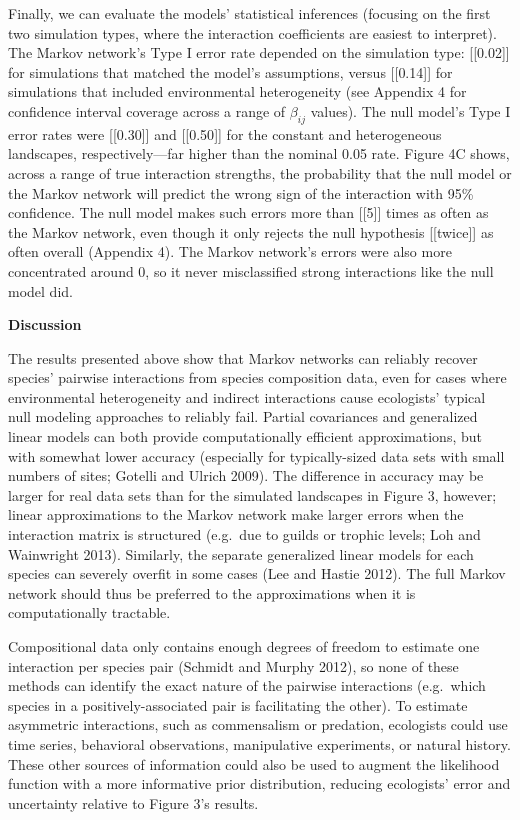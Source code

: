 \documentclass[12pt,]{article}
\begin{document}
\begin{spacing}{1.9}
\begin{flushleft}
Finally, we can evaluate the models' statistical inferences (focusing on
the first two simulation types, where the interaction coefficients are
easiest to interpret). The Markov network's Type I error rate depended
on the simulation type: {[}{[}0.02{]}{]} for simulations that matched
the model's assumptions, versus {[}{[}0.14{]}{]} for simulations that
included environmental heterogeneity (see Appendix 4 for confidence
interval coverage across a range of \(\beta_{ij}\) values). The null
model's Type I error rates were {[}{[}0.30{]}{]} and {[}{[}0.50{]}{]}
for the constant and heterogeneous landscapes, respectively---far higher
than the nominal 0.05 rate. Figure 4C shows, across a range of true
interaction strengths, the probability that the null model or the Markov
network will predict the wrong sign of the interaction with 95\%
confidence. The null model makes such errors more than {[}{[}5{]}{]}
times as often as the Markov network, even though it only rejects the
null hypothesis {[}{[}twice{]}{]} as often overall (Appendix 4). The
Markov network's errors were also more concentrated around 0, so it
never misclassified strong interactions like the null model did.

\noindent
\textbf{Discussion}

\noindent
The results presented above show that Markov networks can reliably
recover species' pairwise interactions from species composition data,
even for cases where environmental heterogeneity and indirect
interactions cause ecologists' typical null modeling approaches to
reliably fail. Partial covariances and generalized linear models can
both provide computationally efficient approximations, but with somewhat
lower accuracy (especially for typically-sized data sets with small
numbers of sites; Gotelli and Ulrich 2009). The difference in accuracy
may be larger for real data sets than for the simulated landscapes in
Figure 3, however; linear approximations to the Markov network make
larger errors when the interaction matrix is structured (e.g.~due to
guilds or trophic levels; Loh and Wainwright 2013). Similarly, the
separate generalized linear models for each species can severely overfit
in some cases (Lee and Hastie 2012). The full Markov network should thus
be preferred to the approximations when it is computationally tractable.

Compositional data only contains enough degrees of freedom to estimate
one interaction per species pair (Schmidt and Murphy 2012), so none of
these methods can identify the exact nature of the pairwise interactions
(e.g.~which species in a positively-associated pair is facilitating the
other). To estimate asymmetric interactions, such as commensalism or
predation, ecologists could use time series, behavioral observations,
manipulative experiments, or natural history. These other sources of
information could also be used to augment the likelihood function with a
more informative prior distribution, reducing ecologists' error and
uncertainty relative to Figure 3's results.


\end{flushleft}
\end{spacing}
\end{document}
